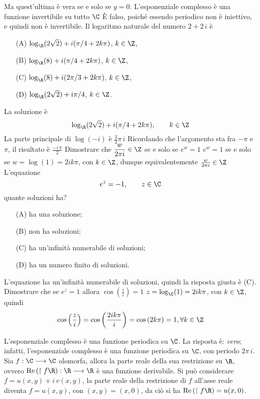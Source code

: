 Ma quest'ultima è vera se e solo se $y=0$.
    L'esponenziale complesso è una funzione invertibile su tutto $ \C $
    È falso, poiché essendo periodico non è iniettivo, e quindi non è invertibile.
    Il logaritmo naturale del numero $ 2+2\,i $ è \begin{itemize}
        \item[(A)] $\log_{\R} (2\sqrt{2})+i(\pi/4+2k\pi)$, $ k \in \Z $, 
        \item[(B)] $\log_{\R}(8)+i(\pi/4+2k\pi)$, $ k \in \Z $, 
        \item[(C)] $\log_{\R}(8)+i(2\pi/3+2k\pi)$, $ k \in \Z $, 
        \item[(D)]$\log_{\R}(2\sqrt{2})+i\pi/4$, $ k \in \Z $.
    \end{itemize}
    La soluzione è \[
        \log_{\R} (2\sqrt{2})+i(\pi/4+2k\pi),\qquad k \in \Z
    \]
    La parte principale di $ \log(-i) $ è $ \frac{3}{2}\pi\,i $
Ricordando che l'argomento sta fra $-\pi$ e $\pi$, il risultato è $\frac{-i\,\pi}{2}$ 
    Dimostrare che $\displaystyle \frac{w}{2\pi i}  \in \Z$ se e solo se $\displaystyle e^w=1$   
    $e^w=1$ se e solo se $w=\log(1)=2ik\pi$, con $k \in \Z$, dunque equivalentemente $\frac{w}{2\pi i}  \in \Z$
    L'equazione \[
        e^{z} = -1,\qquad z \in \C
    \]quante soluzioni ha? \begin{itemize}
        \item[(A)] ha una soluzione; 
        \item[(B)] non ha soluzioni; 
        \item[(C)] ha un'infinità numerabile di soluzioni; 
        \item[(D)] ha un numero finito di soluzioni.
    \end{itemize}
    L'equazione ha un'infinità numerabile di soluzioni, quindi la risposta giusta è (C). 
    Dimostrare che se $e^z=1$ allora $\cos(\frac{z}{i})=1$
    $z=\log_{\C} (1)=2ik\pi$, con $k \in \Z$, quindi \[
        \cos\left(\frac{z}{i}\right)=\cos\left(\frac{2ik\pi}{i}\right)=\cos\left(2k\pi\right)=1, \forall k \in \Z
    \]

L'esponenziale complesso è una funzione periodica su $ \C $.
    La risposta è: \emph{vero}; infatti, l'esponenziale complesso è una funzione periodica su $ \C $, con periodo $ 2\pi \,i $.
    Sia $f : \C \longrightarrow \C$ olomorfa, allora la parte reale della sua restrizione su $\R$, ovvero $\operatorname{Re}\left(\restriction{f}{\R}\right) : \R \longrightarrow \R$ è una funzione derivabile.
    Si può considerare $f = u(x,y) + i\, v(x,y)$, la parte reale della restrizione di $f$ all'asse reale diventa $f = u(x,y)$, con $(x,y) = (x,0)$, da ciò si ha
    $\operatorname{Re}\left(\restriction{f}{\R}\right) = u(x,0)$. 
    
